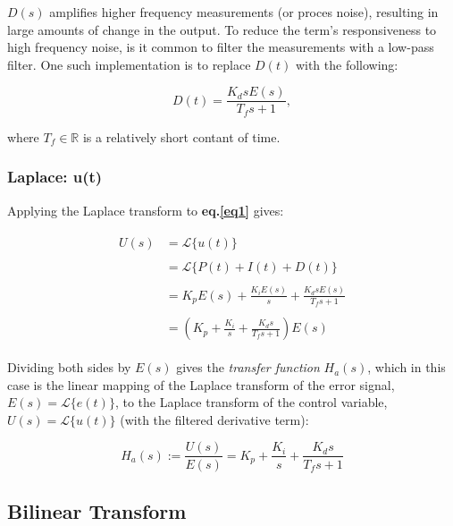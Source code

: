 \documentclass[11pt]{article}
\newcommand{\R}{\mathbb{R}}
\theoremstyle{definition}
\begin{document}
$D(s)$ amplifies higher frequency measurements (or proces noise), resulting in large amounts of change in the output. To reduce the term's responsiveness to
high frequency noise, is it common to filter the measurements with a low-pass filter. One such implementation is to replace $D(t)$ with the following:

\[ D(t) = \frac{K_{d}sE(s)}{T_{f}s + 1},\] 

where $T_{f} \in \R$ is a relatively short contant of time.
\subsubsection{Laplace: u(t)}

Applying the Laplace transform to \textbf{eq.\ref{eq1}} gives:

\begin{align*}
\begin{split}
    U(s) &= \mathcal{L}\{u(t)\} \\\\
         &= \mathcal{L}\{P(t) + I(t) + D(t)\} \\\\
         &= K_{p}E(s) + \frac{K_{i}E(s)}{s} + \frac{K_{d}sE(s)}{T_{f}s + 1}\\\\
         &= \left(K_{p} + \frac{K_{i}}{s} + \frac{K_{d}s}{T_{f}s + 1}\right)E(s)
\end{split}
\end{align*}

Dividing both sides by $E(s)$ gives the \textit{transfer function} $H_{a}(s)$, which in this case is the linear mapping of the Laplace transform of
the error signal, $E(s) = \mathcal{L}\{e(t)\}$, to the Laplace transform of the control variable, $U(s) = \mathcal{L}\{u(t)\}$ (with the filtered
derivative term):

\begin{equation} \label{eq3}
    \boxed{
        H_{a}(s) := \frac{U(s)}{E(s)} = K_{p} + \frac{K_{i}}{s} + \frac{K_{d}s}{T_{f}s + 1} 
    }
\end{equation}

\subsection{Bilinear Transform}
\end{document}
